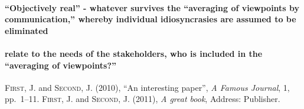 \documentclass{lps}
\begin{document}
\paragraph{“Objectively real” - whatever survives the “averaging of viewpoints
by communication,” whereby individual idiosyncrasies are assumed to be
eliminated}
\paragraph{relate to the needs of the stakeholders, who is included in the
“averaging of viewpoints?”}





\begin{thebibliography}{AAA}
 \textsc{First, J.} and \textsc{Second, J.} (2010), ``An interesting paper'', \emph{A Famous Journal}, 1, pp.~1--11.
 \textsc{First, J.} and \textsc{Second, J.} (2011), \emph{A great book}, Address: Publisher.
\end{thebibliography}
\end{document}
